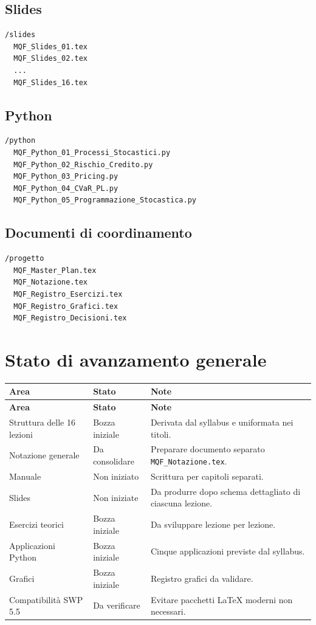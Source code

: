 \documentclass[12pt,a4paper]{article}%
\begin{document}
\subsection{Slides}
\begin{verbatim}
/slides
  MQF_Slides_01.tex
  MQF_Slides_02.tex
  ...
  MQF_Slides_16.tex
\end{verbatim}

\subsection{Python}
\begin{verbatim}
/python
  MQF_Python_01_Processi_Stocastici.py
  MQF_Python_02_Rischio_Credito.py
  MQF_Python_03_Pricing.py
  MQF_Python_04_CVaR_PL.py
  MQF_Python_05_Programmazione_Stocastica.py
\end{verbatim}

\subsection{Documenti di coordinamento}
\begin{verbatim}
/progetto
  MQF_Master_Plan.tex
  MQF_Notazione.tex
  MQF_Registro_Esercizi.tex
  MQF_Registro_Grafici.tex
  MQF_Registro_Decisioni.tex
\end{verbatim}

\section{Stato di avanzamento generale}

\begin{longtable}{p{4.2cm}p{3.0cm}p{7.0cm}}
\hline
\textbf{Area} & \textbf{Stato} & \textbf{Note} \\
\hline
\endfirsthead
\hline
\textbf{Area} & \textbf{Stato} & \textbf{Note} \\
\hline
\endhead
Struttura delle 16 lezioni & Bozza iniziale & Derivata dal syllabus e uniformata nei titoli. \\
Notazione generale & Da consolidare & Preparare documento separato \texttt{MQF\_Notazione.tex}. \\
Manuale & Non iniziato & Scrittura per capitoli separati. \\
Slides & Non iniziate & Da produrre dopo schema dettagliato di ciascuna lezione. \\
Esercizi teorici & Bozza iniziale & Da sviluppare lezione per lezione. \\
Applicazioni Python & Bozza iniziale & Cinque applicazioni previste dal syllabus. \\
Grafici & Bozza iniziale & Registro grafici da validare. \\
Compatibilit\`{a} SWP 5.5 & Da verificare & Evitare pacchetti LaTeX moderni non necessari. \\
\hline
\end{longtable}
\end{document}
